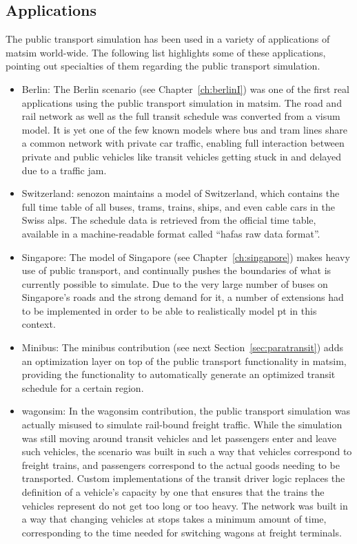 \subsection{Applications}
The public transport simulation has been used in a variety of applications of
\gls{matsim} world-wide. The following list highlights some of these applications,
pointing out specialties of them regarding the public transport simulation.

\begin{itemize}\styleItemize
	\item Berlin: The Berlin scenario (see Chapter~\ref{ch:berlinI}) was one of
	the first real applications using the public transport simulation in \gls{matsim}.
	The road and rail network as well as the full transit schedule was converted
	from a \gls{visum} model. It is yet one of the few known models where bus and tram
	lines share a common network with private car traffic, enabling full
	interaction between private and public vehicles like transit vehicles getting
	stuck in and delayed due to a traffic jam.
	\item Switzerland: \gls{senozon} maintains a model of Switzerland, which contains the
	full time table of all buses, trams, trains, ships, and even cable cars in the
	Swiss alps. The schedule data is retrieved from the official time table,
	available in a machine-readable format called ``\gls{hafas} raw data format''.
	\item Singapore: The model of Singapore (see Chapter~\ref{ch:singapore}) makes
	heavy use of public transport, and continually pushes the boundaries of what is
	currently possible to simulate. Due to the very large number of buses on
	Singapore's roads and the strong demand for it, a number of extensions had to
	be implemented in order to be able to realistically model pt in this context.
	\item Minibus: The minibus contribution (see next Section~\ref{sec:paratransit}) 
	adds an optimization layer on top of the public
	transport functionality in \gls{matsim}, providing the functionality to automatically
	generate an optimized transit schedule for a certain region.
	\item wagonsim: In the wagonsim contribution, %
	the public transport simulation was actually misused to simulate
	rail-bound freight traffic. While the simulation was still moving around
	transit vehicles and let passengers enter and leave such vehicles, the scenario
	was built in such a way that vehicles correspond to freight trains, and
	passengers correspond to the actual goods needing to be transported. Custom
	implementations of the transit driver logic replaces the definition of a
	vehicle's capacity by one that ensures that the trains the vehicles represent
	do not get too long or too heavy. The network was built in a way that changing
	vehicles at stops takes a minimum amount of time, corresponding to the time
	needed for switching wagons at freight terminals.
\end{itemize}

